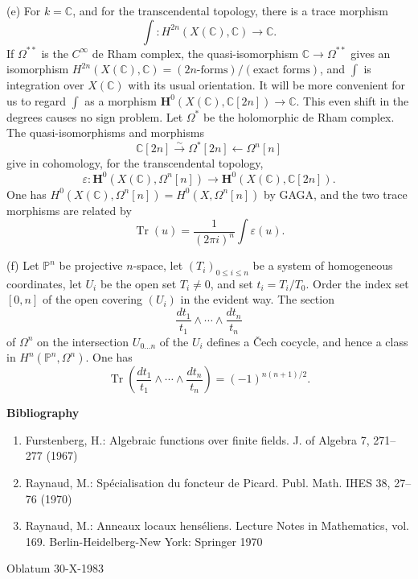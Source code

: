 \documentclass[11pt,leqno]{article}
\DeclareMathOperator{\Tr}{Tr}
\newcommand{\CC}{\mathbb C}
\newcommand{\PP}{\mathbb P}
\begin{document}
\noindent (e) For $k=\CC$, and for the transcendental topology, there is a trace morphism
\[
        \int:H^{2n}(X(\CC),\CC)\longrightarrow\CC.
\]
If $\Omega^{**}$ is the $C^\infty$ de Rham complex, the quasi-isomorphism $\CC\to\Omega^{**}$ gives an isomorphism $H^{2n}(X(\CC),\CC)=(2n\text{-forms})/(\text{exact forms})$, and $\int$ is integration over $X(\CC)$ with its usual orientation. It will be more convenient for us to regard $\int$ as a morphism $\mathbf H^0(X(\CC),\CC[2n])\to\CC$. This even shift in the degrees causes no sign problem. Let $\Omega^*$ be the holomorphic de Rham complex. The quasi-isomorphisms and morphisms
\[
        \CC[2n]\xrightarrow{\sim}\Omega^*[2n]\longleftarrow\Omega^n[n]
\]
give in cohomology, for the transcendental topology,
\[
        \varepsilon:\mathbf H^0(X(\CC),\Omega^n[n])\longrightarrow \mathbf H^0(X(\CC),\CC[2n]).
\]
One has $H^0(X(\CC),\Omega^n[n])=H^0(X,\Omega^n[n])$ by GAGA, and the two trace morphisms are related by
\[
        \Tr(u)=\frac{1}{(2\pi i)^n}\int \varepsilon(u).
\]

\noindent (f) Let $\PP^n$ be projective $n$-space, let $(T_i)_{0\le i\le n}$ be a system of homogeneous coordinates, let $U_i$ be the open set $T_i\ne0$, and set $t_i=T_i/T_0$. Order the index set $[0,n]$ of the open covering $(U_i)$ in the evident way. The section
\[
        \frac{dt_1}{t_1}\wedge\cdots\wedge\frac{dt_n}{t_n}
\]
of $\Omega^n$ on the intersection $U_{0\ldots n}$ of the $U_i$ defines a Čech cocycle, and hence a class in $H^n(\PP^n,\Omega^n)$. One has
\[
        \Tr\left(\frac{dt_1}{t_1}\wedge\cdots\wedge\frac{dt_n}{t_n}\right)
        =(-1)^{n(n+1)/2}.
\]

\begin{center}
{\Large\bfseries Bibliography}
\end{center}
\begin{enumerate}[label=\arabic*.,leftmargin=2em,itemsep=0pt,topsep=0.3em]
\item Furstenberg, H.: Algebraic functions over finite fields. J. of Algebra 7, 271--277 (1967)
\item Raynaud, M.: Spécialisation du foncteur de Picard. Publ. Math. IHES 38, 27--76 (1970)
\item Raynaud, M.: Anneaux locaux henséliens. Lecture Notes in Mathematics, vol. 169. Berlin-Heidelberg-New York: Springer 1970
\end{enumerate}

\vspace{1.2em}
\begin{center}
Oblatum 30-X-1983
\end{center}
\vfill
\end{document}

